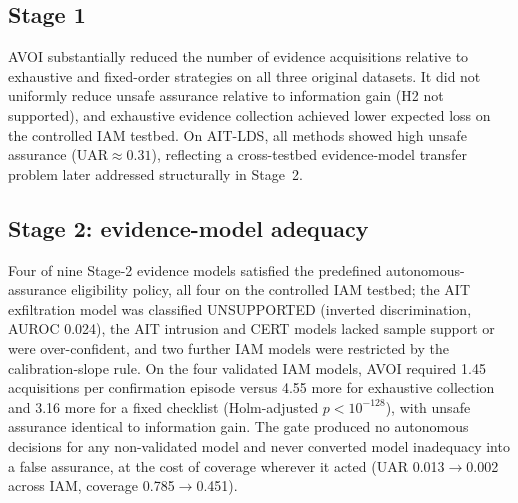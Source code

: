 \subsection{Stage 1}
AVOI substantially reduced the number of evidence acquisitions relative to exhaustive and fixed-order strategies on
all three original datasets. It did not uniformly reduce unsafe assurance relative to information gain (H2 not
supported), and exhaustive evidence collection achieved lower expected loss on the controlled IAM testbed. On
AIT-LDS, all methods showed high unsafe assurance ($\mathrm{UAR}\approx 0.31$), reflecting a cross-testbed evidence-model
transfer problem later addressed structurally in Stage~2.

\subsection{Stage 2: evidence-model adequacy}
Four of nine Stage-2 evidence models satisfied the predefined autonomous-assurance eligibility policy, all four on the
controlled IAM testbed; the AIT exfiltration model was classified UNSUPPORTED (inverted discrimination, AUROC 0.024),
the AIT intrusion and CERT models lacked sample support or were over-confident, and two further IAM models were
restricted by the calibration-slope rule. On the four validated IAM models, AVOI required 1.45 acquisitions per
confirmation episode versus 4.55 more for exhaustive collection and 3.16 more for a fixed checklist (Holm-adjusted
$p<10^{-128}$), with unsafe assurance identical to information gain. The gate produced no autonomous decisions for any
non-validated model and never converted model inadequacy into a false assurance, at the cost of coverage wherever it
acted (UAR 0.013$\to$0.002 across IAM, coverage 0.785$\to$0.451).


